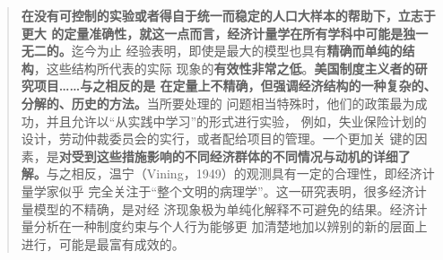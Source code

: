 \begin{quotation}
  \textbf{在没有可控制的实验或者得自于统一而稳定的人口大样本的帮助下，立志于更大
    的定量准确性，就这一点而言，经济计量学在所有学科中可能是独一无二的。}迄今为止
  经验表明，即使是最大的模型也具有\textbf{精确而单纯的结构}，这些结构所代表的实际
  现象的\textbf{有效性非常之低}。\textbf{美国制度主义者的研究项目……与之相反的是
    在定量上不精确，但强调经济结构的一种复杂的、分解的、历史的方法。}当所要处理的
  问题相当特殊时，他们的政策最为成功，并且允许以“从实践中学习”的形式进行实验，
  例如，失业保险计划的设计，劳动仲裁委员会的实行，或者配给项目的管理。一个更加关
  键的因素，是\textbf{对受到这些措施影响的不同经济群体的不同情况与动机的详细了
    解。}与之相反，温宁（Vining，1949）的观测具有一定的合理性，即经济计量学家似乎
  完全关注于“整个文明的病理学”。这一研究表明，很多经济计量模型的不精确，是对经
  济现象极为单纯化解释不可避免的结果。经济计量分析在一种制度约束与个人行为能够更
  加清楚地加以辨别的新的层面上进行，可能是最富有成效的。
\end{quotation}

